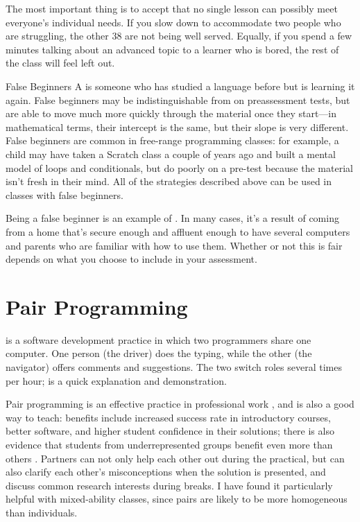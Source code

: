 The most important thing is to accept that no single lesson can possibly
meet everyone's individual needs. If you slow down to accommodate two
people who are struggling, the other 38 are not being well served.
Equally, if you spend a few minutes talking about an advanced topic to a
learner who is bored, the rest of the class will feel left out.

\begin{aside}{False Beginners}
  A  is someone who has
  studied a language before but is learning it again. False beginners
  may be indistinguishable from
   on preassessment
  tests, but are able to move much more quickly through the material
  once they start---in mathematical terms, their intercept is the same,
  but their slope is very different. False beginners are common in
  free-range programming classes: for example, a child may have taken a
  Scratch class a couple of years ago and built a mental model of loops
  and conditionals, but do poorly on a pre-test because the material
  isn't fresh in their mind. All of the strategies described above can
  be used in classes with false beginners.

  Being a false beginner is an example of
  \cite{Marg2010}. In many cases, it's a result of coming from a home
  that's secure enough and affluent enough to have several computers and
  parents who are familiar with how to use them. Whether or not this is
  fair depends on what you choose to include in your assessment.
\end{aside}

\section{Pair Programming}\label{s:classroom-pair}

 is a software development
practice in which two programmers share one computer. One person (the
driver) does the typing, while the other (the navigator) offers
comments and suggestions. The two switch roles several times per hour;
 is a quick explanation and
demonstration.

Pair programming is an effective practice in professional work
\cite{Hann2009}, and is also a good way to teach: benefits include
increased success rate in introductory courses, better software, and
higher student confidence in their solutions; there is also evidence
that students from underrepresented groups benefit even more than
others
\cite{McDo2006,Hank2011,Port2013,Cele2018}.
Partners can not only help each other out during the practical, but
can also clarify each other's misconceptions when the solution is
presented, and discuss common research interests during breaks. I have
found it particularly helpful with mixed-ability classes, since pairs
are likely to be more homogeneous than individuals.

